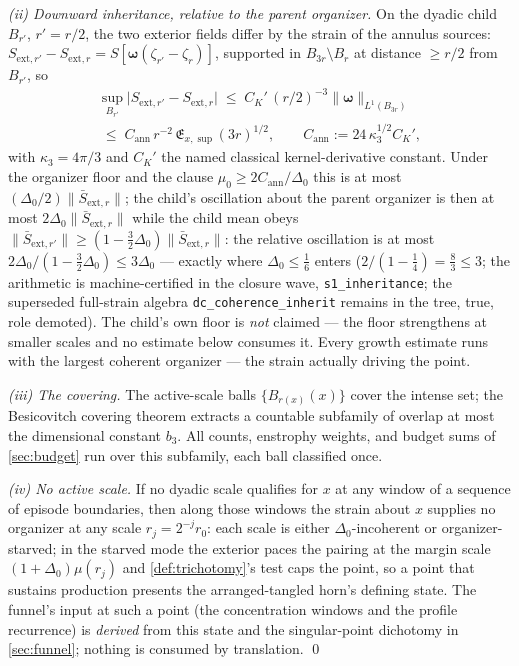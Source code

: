 \documentclass[11pt,letterpaper]{amsart}
\theoremstyle{definition}
\theoremstyle{remark}
\newcommand{\vort}{\boldsymbol{\omega}}
\newcommand{\norm}[1]{\lVert #1 \rVert}
\newcommand{\abs}[1]{\lvert #1 \rvert}
\begin{document}
\emph{(ii) Downward inheritance, relative to the parent organizer.} On the
dyadic child $B_{r'}$, $r'=r/2$, the two exterior fields differ by the strain
of the annulus sources:
$S_{\mathrm{ext},r'}-S_{\mathrm{ext},r}=S[\vort(\zeta_{r'}-\zeta_r)]$,
supported in $B_{3r}\setminus B_r$ at distance $\ge r/2$ from $B_{r'}$, so
\begin{multline*}
\sup_{B_{r'}}\abs{S_{\mathrm{ext},r'}-S_{\mathrm{ext},r}}
\;\le\;C_K'\,(r/2)^{-3}\norm{\vort}_{L^1(B_{3r})}\\
\;\le\;C_{\mathrm{ann}}\,r^{-2}\,\mathfrak{E}_{x,\sup}(3r)^{1/2},
\qquad C_{\mathrm{ann}}:=24\,\kappa_3^{1/2}C_K',
\end{multline*}
with $\kappa_3=4\pi/3$ and $C_K'$ the named classical kernel-derivative
constant. Under the organizer floor and the clause
$\mu_0\ge2C_{\mathrm{ann}}/\Delta_0$ this is at most
$(\Delta_0/2)\norm{\bar S_{\mathrm{ext},r}}$; the child's oscillation about
the parent organizer is then at most $2\Delta_0\norm{\bar S_{\mathrm{ext},r}}$
while the child mean obeys $\norm{\bar S_{\mathrm{ext},r'}}\ge
(1-\tfrac32\Delta_0)\norm{\bar S_{\mathrm{ext},r}}$: the relative
oscillation is at most $2\Delta_0/(1-\tfrac32\Delta_0)\le3\Delta_0$ ---
exactly where $\Delta_0\le\tfrac16$ enters ($2/(1-\tfrac14)=\tfrac83\le3$;
the arithmetic is machine-certified in the closure wave,
\texttt{s1\_inheritance}; the superseded full-strain algebra
\texttt{dc\_coherence\_inherit} remains in the tree, true, role demoted).
The child's own floor is \emph{not} claimed --- the floor strengthens at
smaller scales and no estimate below consumes it. Every growth estimate runs
with the largest coherent organizer --- the strain actually driving the point.

\emph{(iii) The covering.} The active-scale balls $\{B_{r(x)}(x)\}$ cover the intense
set; the Besicovitch covering theorem \cite{Mattila1995} extracts a countable
subfamily of overlap at most the dimensional constant $b_3$. All counts,
enstrophy weights, and budget sums of \cref{sec:budget} run over this subfamily, each
ball classified once.

\emph{(iv) No active scale.} If no dyadic scale qualifies for $x$ at any window of a
sequence of episode boundaries, then along those windows the strain about $x$
supplies no organizer at any scale $r_j=2^{-j}r_0$: each scale is either
$\Delta_0$-incoherent or organizer-starved; in the starved mode the exterior
paces the pairing at the margin scale $(1+\Delta_0)\mu(r_j)$ and
\cref{def:trichotomy}'s test caps the point, so a point that sustains
production presents the arranged-tangled horn's defining state. The funnel's input at such a point (the concentration
windows and the profile recurrence) is \emph{derived} from this state and the
singular-point dichotomy in \cref{sec:funnel}; nothing is consumed by
translation. \qed
\end{document}
